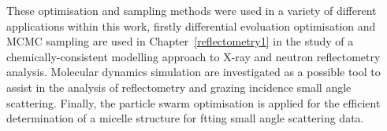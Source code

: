 These optimisation and sampling methods were used in a variety of different applications within this work, firstly differential evoluation optimisation and MCMC sampling are used in Chapter~\ref{reflectometry1} in the study of a chemically-consistent modelling approach to X-ray and neutron reflectometry analysis.
Molecular dynamics simulation are investigated as a possible tool to assist in the analysis of reflectometry and grazing incidence small angle scattering.
Finally, the particle swarm optimisation is applied for the efficient determination of a micelle structure for ftting small angle scattering data.
